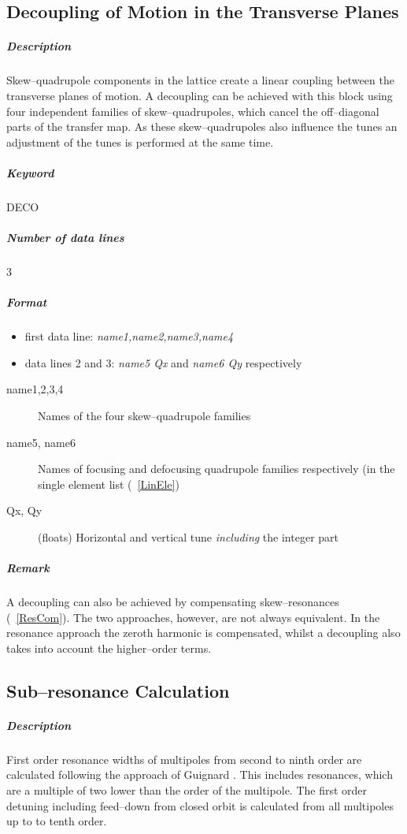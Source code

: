 \subsection{Decoupling of Motion in the Transverse Planes}
\label{LinDec} 

\subparagraph{Description} Skew--quadrupole components in the lattice
create a linear coupling between the transverse planes of motion. A
decoupling can be achieved with this block using four independent
families of skew--quadrupoles, which cancel the off--diagonal parts of
the transfer map. As these skew--quadrupoles also influence the tunes
an adjustment of the tunes is performed at the same time.

\subparagraph{Keyword} DECO \subparagraph{Number of data lines} 3

\subparagraph{Format}
\begin{itemize}
\item first data line: {\em name1,name2,name3,name4}
\item data lines 2 and 3: {\em name5 Qx} \/and {\em name6 Qy}
  \/respectively
\end{itemize}

\begin{description}
\item [name1,2,3,4] Names of the four skew--quadrupole families
\item [name5, name6] Names of focusing and defocusing quadrupole
  families respectively (in the single element list (~\ref{LinEle})
\item [Qx, Qy] (floats) Horizontal and vertical tune {\em including}
  \/the integer part
\end{description}

\subparagraph{Remark} A decoupling can also be achieved by
compensating skew--resonances (~\ref{ResCom}).  The two approaches,
however, are not always equivalent. In the resonance approach the
zeroth harmonic is compensated, whilst a decoupling also takes into
account the higher--order terms.

\subsection{Sub--resonance Calculation} \label{SubCal}

\subparagraph{Description} First order resonance widths of multipoles
from second to ninth order are calculated following the approach of
Guignard \cite{Gilbert78}. This includes resonances, which are a
multiple of two lower than the order of the multipole. The first order
detuning including feed--down from closed orbit is calculated from all
multipoles up to to tenth order.

